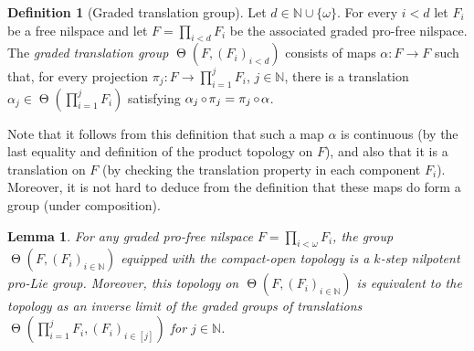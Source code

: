 \documentclass[a4paper,12pt,reqno]{amsart}
\newtheorem{lemma}[theorem]{Lemma}
\theoremstyle{definition}
\newtheorem{defn}[theorem]{Definition}
\def\to{\rightarrow}
\newcommand{\mb}{\mathbb}
\DeclareMathOperator{\tran}{\Theta}
\DeclareMathOperator{\co}{\circ\hspace{-0.02 cm}}
\begin{document}
\begin{defn}[Graded translation group]\label{def:gr-tran}
Let $d\in \mb{N}\cup\{\omega\}$. For every $i< d$ let $F_i$ be a free nilspace and let $F=\prod_{i<d}F_i$ be the associated graded pro-free nilspace. The \emph{graded translation group} $\tran(F,(F_i)_{i< d})$ consists of maps $\alpha: F\to F$ such that, for every projection $\pi_j:F\to \prod_{i=1}^j F_i$, $j\in \mb{N}$, there is a translation $\alpha_j\in \tran(\prod_{i=1}^j F_i)$ satisfying $\alpha_j\co \pi_j = \pi_j\co \alpha$.
\end{defn}
\noindent Note that it follows from this definition that such a map $\alpha$ is continuous (by the last equality and definition of the product topology on $F$), and also that it is a translation on $F$ (by checking the translation property in each component $F_i$). Moreover, it is not hard to deduce from the definition that  these maps do form a group (under composition).
\begin{lemma}\label{lem:top-graded-trans-gr}
For any graded pro-free nilspace $F=\prod_{i<\omega} F_i$, the group $\tran(F,(F_i)_{i\in \mb{N}})$ equipped with the compact-open topology is a $k$-step nilpotent pro-Lie group. Moreover, this topology on $\tran(F,(F_i)_{i\in \mb{N}})$ is equivalent to the  topology as an inverse limit of the graded groups of translations $\tran(\prod_{i=1}^jF_i,(F_i)_{i\in [j]})$ for $j\in \mb{N}$.
\end{lemma}
\end{document}

